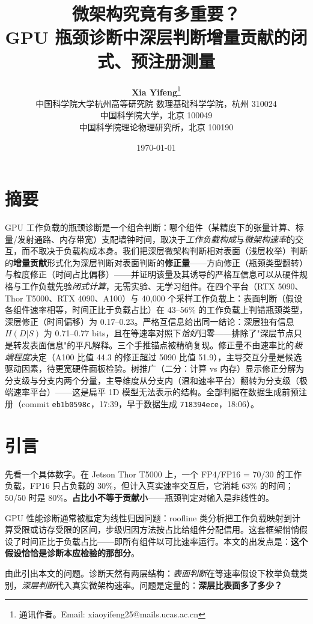 \documentclass[12pt]{ctexart}
\title{\textbf{微架构究竟有多重要？}\\\large GPU 瓶颈诊断中深层判断增量贡献的闭式、预注册测量}
\author{%
  \textbf{Xia Yifeng}\thanks{通讯作者。Email: xiaoyifeng25@mails.ucas.ac.cn}\\
  {\small 中国科学院大学杭州高等研究院 数理基础科学学院，杭州 310024}\\
  {\small 中国科学院大学，北京 100049}\\
  {\small 中国科学院理论物理研究所，北京 100190}
}
\date{\today}
\begin{document}
\maketitle

\section*{摘要}\label{abstract}

GPU 工作负载的瓶颈诊断是一个组合判断：哪个组件（某精度下的张量计算、标量/发射通路、内存带宽）支配墙钟时间，取决于\emph{工作负载构成}与\emph{微架构速率}的交互，而不取决于负载构成本身。我们把深层微架构判断相对表面（浅层枚举）判断的\textbf{增量贡献}形式化为深层判断对表面判断的\textbf{修正量}——方向修正（瓶颈类型翻转）与粒度修正（时间占比偏移）——并证明该量及其诱导的严格互信息可以从硬件规格与工作负载先验\emph{闭式计算}，无需实验、无学习组件。在四个平台（RTX 5090、Thor T5000、RTX 4090、A100）与 40{,}000 个采样工作负载上：表面判断（假设各组件速率相等，时间正比于负载占比）在 43--56\% 的工作负载上判错瓶颈类型，深层修正（时间偏移）为 0.17--0.23。严格互信息给出同一结论：深层独有信息 $H(D|S)$ 为 0.71--0.77 bits，且在等速率对照下\emph{恰好}归零——排除了"深层节点只是转发表面信息"的平凡解释。三个手推锚点被精确复现。修正量不由速率比的\emph{极端程度}决定（A100 比值 44.3 的修正超过 5090 比值 51.9），主导交互分量是候选驱动因素，待更宽硬件面板检验。树推广（二分：计算 vs 内存）显示修正分解为分支级与分支内两个分量，主导维度从分支内（温和速率平台）翻转为分支级（极端速率平台）——这是扁平 1D 模型无法表示的结构。全部判据在数据生成前预注册（commit \texttt{eb1b0598c}，17:39，早于数据生成 \texttt{718394ece}，18:06）。

\section{引言}\label{introduction}

先看一个具体数字。在 Jetson Thor T5000 上，一个 FP4/FP16 = 70/30 的工作负载，FP16 只占负载的 30\%，但计入真实速率交互后，它消耗 63\% 的时间；50/50 时是 80\%。\textbf{占比小不等于贡献小}——瓶颈判定对输入是非线性的。

GPU 性能诊断通常被框定为线性归因问题：roofline 类分析把工作负载映射到计算受限或访存受限的区间\cite{roofline2009,rooflineHier2020,rooflineTime2020}，步级归因方法按占比给组件分配信用。这套框架悄悄假设了时间正比于负载占比——即所有组件以可比速率运行。本文的出发点是：\textbf{这个假设恰恰是诊断本应检验的那部分}。

由此引出本文的问题。诊断天然有两层结构：\emph{表面判断}在等速率假设下枚举负载类别，\emph{深层判断}代入真实微架构速率。问题是定量的：\textbf{深层比表面多了多少？}
\end{document}
